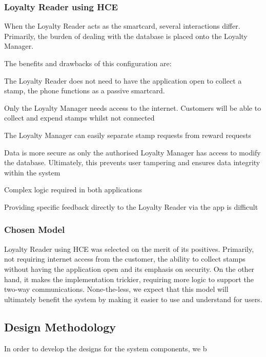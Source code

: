 \subsubsection{Loyalty Reader using HCE}
When the Loyalty Reader acts as the smartcard, several interactions differ. Primarily, the burden of dealing with the database is placed onto the Loyalty Manager.

The benefits and drawbacks of this configuration are: 
\begin{description}[leftmargin=!,labelwidth=\widthof{\bfseries small}]
    \item[+] The Loyalty Reader does not need to have the application open to collect a stamp, the phone functions as a passive smartcard.
    \item[+] Only the Loyalty Manager needs access to the internet. Customers will be able to collect and expend stamps whilst not connected
    \item[+] The Loyalty Manager can easily separate stamp requests from reward requests
    \item[+] Data is more secure as only the authorised Loyalty Manager has access to modify the database. Ultimately, this prevents user tampering and ensures data integrity within the system
    \item[---] Complex logic required in both applications
    \item[---] Providing specific feedback directly to the Loyalty Reader via the app is difficult
\end{description}

\subsubsection{Chosen Model}
Loyalty Reader using HCE was selected on the merit of its positives. Primarily, not requiring internet access from the customer, the ability to collect stamps without having the application open and its emphasis on security. On the other hand, it makes the implementation trickier, requiring more logic to support the two-way communications. None-the-less, we expect that this model will ultimately benefit the system by making it easier to use and understand for users.

\subsection{Design Methodology}
In order to develop the designs for the system components, we b
